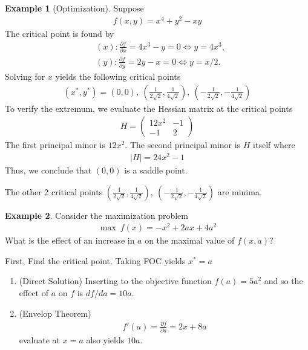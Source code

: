 \documentclass[11pt,a4paper]{book}
\theoremstyle{definition}\newtheorem{definition}{Definition}
\theoremstyle{definition}\newtheorem{fact}{Fact}
\theoremstyle{definition}\newtheorem{remark}{Remark}
\theoremstyle{definition}\newtheorem{ex}{Ex.}
\theoremstyle{definition}\newtheorem{project}{Project}
\theoremstyle{definition}\newtheorem{problem}{Problem}
\theoremstyle{definition}\newtheorem{example}{Example}
\numberwithin{theorem}{section}
\numberwithin{corollary}{chapter}
\numberwithin{assumption}{chapter}
\numberwithin{definition}{chapter}
\numberwithin{prop}{chapter}
\numberwithin{notation}{chapter}
\numberwithin{problem}{chapter}
\numberwithin{example}{chapter}
\numberwithin{fact}{chapter}
\numberwithin{ex}{chapter}
\begin{document}
	\begin{example}[Optimization]
	\label{ex:soc2}
		Suppose
		\begin{align*}
			f(x,y) = x^4 + y^2 - xy 
		\end{align*}
		The critical point is found by
		\begin{align*}
			& (x): \frac{\partial f}{\partial x} = 4x^3 - y = 0 \iff y  = 4 x^3, \\
			& (y): \frac{\partial f}{\partial y} = 2y - x = 0 \iff y = x/2.      
		\end{align*}
		Solving for $x$ yields the following critical points
		\begin{align*}
			(x^*,y^*) = (0,0), \ (\frac{1}{2\sqrt{2}} , \frac{1}{4\sqrt{2}}  ), \ (-\frac{1}{2\sqrt{2}} , -\frac{1}{4\sqrt{2}}  ) 
		\end{align*}
		To verify the extremum, we evaluate the Hessian matrix at the critical points
		\begin{align*}
			H = \begin{pmatrix}
				12 x^2 & -1 \\
				-1     & 2  
			\end{pmatrix}
		\end{align*}
		The first principal minor is $12x^2$. The second principal minor is $H$ itself where
		\begin{align*}
			| H | = 24 x^2 - 1 
		\end{align*} 
		Thus, we conclude that $(0,0)$ is a saddle point. 
		
		The other 2 critical points $(\frac{1}{2\sqrt{2}} , \frac{1}{4\sqrt{2}}  ), \ (-\frac{1}{2\sqrt{2}} , -\frac{1}{4\sqrt{2}}  )$ are minima.
	\end{example}
	
	\begin{example}
		Consider the maximization problem
		\begin{align*}
			\max \ f(x) = - x^2 + 2ax + 4 a^2 
		\end{align*}
		What is the effect of an increase in $a$ on the maximal value of $f(x,a)$?
		
		First, Find the critical point. Taking FOC yields $x^* = a$
		\begin{enumerate}
			\item (Direct Solution) Inserting to the objective function $f(a) = 5 a^2$ and so the effect of $a$ on $f$ is $df/da = 10a$. \\
			\item (Envelop Theorem) 
			\begin{align*}
				f'(a) = \frac{\partial f}{\partial a} = 2x + 8a 
			\end{align*}
			evaluate at $x=a$ also yields $10a$.
		\end{enumerate}
	\end{example}
	
\end{document}
